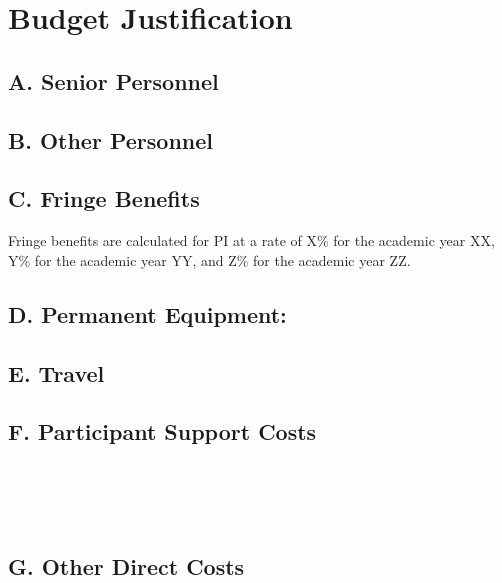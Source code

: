 \section{Budget Justification}
\subsection{A. Senior Personnel}
\subsection{B. Other Personnel}
\subsection{C. Fringe Benefits}
Fringe benefits are calculated for PI at a rate of X\% for the academic year XX, Y\% for the academic year YY, and Z\% for the academic year ZZ.


\subsection{D. Permanent Equipment:}



\subsection{E. Travel}





\subsection{F. Participant Support Costs}
  \\
  \\
  \\

\subsection{G. Other Direct Costs}
  \\
 \\
  \\
  \\
  \\
  \\



